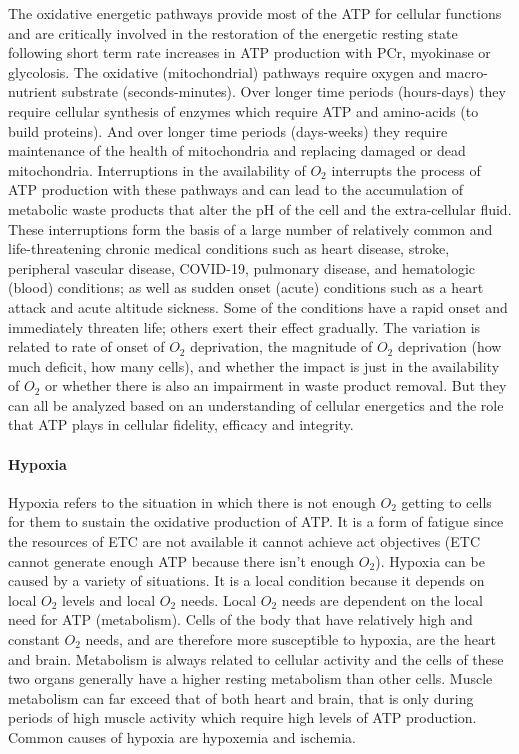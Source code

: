 The oxidative energetic pathways provide most of the ATP for cellular functions and are critically involved in the restoration of the energetic resting state following short term rate increases in ATP production with PCr, myokinase or glycolosis. The oxidative (mitochondrial) pathways require oxygen and macro-nutrient substrate (seconds-minutes). Over longer time periods (hours-days) they require cellular synthesis of enzymes which require ATP and amino-acids (to build proteins). And over longer time periods (days-weeks) they require maintenance of the health of mitochondria and replacing damaged or dead mitochondria. Interruptions in the availability of $O_2$ interrupts the process of ATP production with these pathways and can lead to the accumulation of metabolic waste products that alter the pH of the cell and the extra-cellular fluid. These interruptions form the basis of a large number of relatively common and life-threatening chronic medical conditions such as heart disease, stroke, peripheral vascular disease, COVID-19, pulmonary disease, and hematologic (blood) conditions; as well as sudden onset (acute) conditions such as a heart attack and acute altitude sickness. 
Some of the conditions have a rapid onset and immediately threaten life; others exert their effect gradually. The variation is related to rate of onset of $O_2$ deprivation, the magnitude of $O_2$ deprivation (how much deficit, how many cells), and whether the impact is just in the availability of $O_2$ or whether there is also an impairment in waste product removal. But they can all be analyzed based on an understanding of cellular energetics and the role that ATP plays in cellular fidelity, efficacy and integrity.

\paragraph{Hypoxia}
Hypoxia refers to the situation in which there is not enough $O_2$ getting to cells for them to sustain the oxidative production of ATP. It is a form of fatigue since the resources of ETC are not available it cannot achieve act objectives (ETC cannot generate enough ATP because there isn't enough $O_2$). Hypoxia can be caused by a variety of situations. It is a local condition because it depends on local $O_2$ levels and local $O_2$ needs. Local $O_2$ needs are dependent on the local need for ATP (metabolism). Cells of the body that have relatively high and constant $O_2$ needs, and are therefore more susceptible to hypoxia, are the heart and brain. Metabolism is always related to cellular activity and the cells of these two organs generally have a higher resting metabolism than other cells. Muscle metabolism can far exceed that of both heart and brain, that is only during periods of high muscle activity which require high levels of ATP production. 
Common causes of hypoxia are hypoxemia and ischemia.

